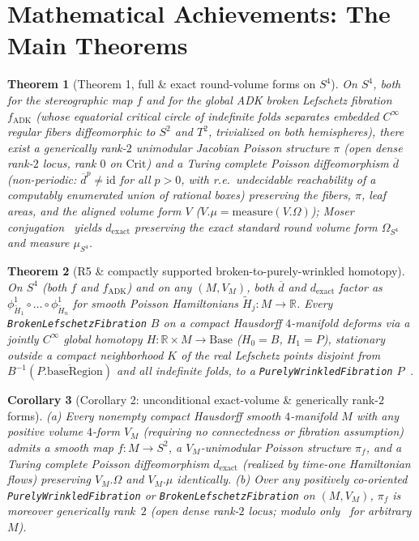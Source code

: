 \documentclass[10pt]{article}
\renewcommand{\_}{\origus\allowbreak}
\newtheorem{theorem}{Theorem}
\newtheorem{corollary}[theorem]{Corollary}
\newcommand{\R}{\mathbb{R}}
\newcommand{\code}[1]{\texttt{#1}}
\newcommand{\Crit}{\mathrm{Crit}}
\begin{document}
\section{Mathematical Achievements: The Main Theorems}

\begin{theorem}[Theorem 1, full \& exact round-volume forms on $S^4$]\label{thm:main}
On $S^4$, both for the stereographic map $f$ and for the global ADK broken Lefschetz fibration
$f_{\mathrm{ADK}}$ (whose equatorial critical circle of indefinite folds separates embedded $C^\infty$
regular fibers diffeomorphic to $S^2$ and $T^2$, trivialized on both hemispheres), there exist a
generically rank-$2$ unimodular Jacobian Poisson structure $\pi$ (open dense rank-$2$ locus, rank
$0$ on $\Crit$) and a Turing complete Poisson diffeomorphism $\overline d$ (non-periodic:
$\overline d^p\neq\mathrm{id}$ for all $p>0$, with r.e.\ undecidable reachability of a computably
enumerated union of rational boxes) preserving the fibers, $\pi$, leaf areas, and the aligned volume
form $V$ ($V.\mu=\mathrm{measure}(V.\Omega)$); Moser conjugation~\cite{Mos65} yields $d_{\mathrm{exact}}$
preserving the exact standard round volume form $\Omega_{S^4}$ and measure $\mu_{S^4}$.
\end{theorem}

\begin{theorem}[R5 \& compactly supported broken-to-purely-wrinkled homotopy]\label{thm:r5}
On $S^4$ (both $f$ and $f_{\mathrm{ADK}}$) and on any $(M,V_M)$, both $\overline d$ and
$d_{\mathrm{exact}}$ factor as $\phi^1_{\tilde H_1}\circ\dots\circ\phi^1_{\tilde H_n}$ for smooth
Poisson Hamiltonians $\tilde H_j\colon M\to\R$. Every \textup{\code{BrokenLefschetzFibration}} $B$ on a
compact Hausdorff $4$-manifold deforms via a jointly $C^\infty$ global homotopy
$H\colon\R\times M\to\mathrm{Base}$ ($H_0=B$, $H_1=P$), stationary outside a compact neighborhood
$K$ of the real Lefschetz points disjoint from $B^{-1}(\overline{P.\mathrm{baseRegion}})$ and all
indefinite folds, to a \textup{\code{PurelyWrinkledFibration}} $P$~\cite[\S3.1, \S4]{Lek09}.
\end{theorem}

\begin{corollary}[Corollary 2: unconditional exact-volume \& generically rank-$2$ forms]
\textup{(a)} Every nonempty compact Hausdorff smooth $4$-manifold $M$ with any positive volume
$4$-form $V_M$ (requiring no connectedness or fibration assumption) admits a smooth map $f\colon
M\to S^2$, a $V_M$-unimodular Poisson structure $\pi_f$, and a Turing complete Poisson
diffeomorphism $d_{\mathrm{exact}}$ (realized by time-one Hamiltonian flows) preserving $V_M.\Omega$
and $V_M.\mu$ \emph{identically}. \textup{(b)} Over any positively co-oriented
\textup{\code{PurelyWrinkledFibration}} or \textup{\code{BrokenLefschetzFibration}} on $(M,V_M)$, $\pi_f$ is
moreover generically rank~$2$ (open dense rank-$2$ locus; modulo only~\cite{GK07} for arbitrary $M$).
\end{corollary}
\end{document}
